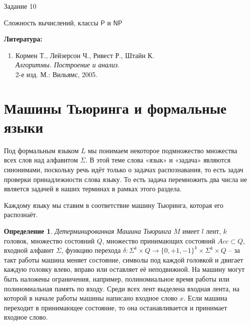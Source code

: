 \documentclass[12pt, leqno]{article}
\theoremstyle{definiton}
\theoremstyle{definition}
\newtheorem{Def}{Определение}
\theoremstyle{definition}
\def\PP{{\mathsf{P}}}
\def\NP{{\mathsf{NP}}}
\begin{document}
\centerline{\LARGE Задание 10}

\medskip

\begin{center}
	{\Large Сложность вычислений, классы $\PP$ и $\NP$ }
\end{center}

\bigskip

{\bf Литература: }
\begin{enumerate}

\item Кормен Т., Лейзерсон Ч., Ривест Р., Штайн К. \\ {\it Алгоритмы. Построение и анализ. }\\  2-е изд. М.: Вильямс, 2005.

\end{enumerate}

\section{Машины Тьюринга и формальные языки}

	Под формальным языком $L$ мы понимаем некоторое подмножество множества всех слов над алфавитом $\Sigma$. В этой теме слова «язык» и «задача» являются синонимами, поскольку речь идёт только о задачах распознавания, то есть задач проверки принадлежности слова языку. То есть задача перемножить два числа не является задачей в наших терминах в рамках этого раздела.
	
	Каждому языку мы ставим в соответствие машину Тьюринга, которая его распознаёт. 

\begin{Def} 

	\emph{Детерминированная Машина Тьюринга} $M$  имеет $l$ лент, $k$ головок, множество состояний $Q$, множество принимающих состояний $Acc \subset Q$,  входной алфавит $\Sigma$, функцию перехода $\delta : \Sigma^k\times Q \to \{0,+1,-1\}^k\times \Sigma^k\times Q  $ -- за такт работы машина меняет состояние, символы под каждой головкой и двигает каждую головку влево, вправо или оставляет её неподвижной. На машину могут быть наложены ограничения, например, полиномиальное время работы или полиномиальная память по входу. Среди всех лент выделена входная лента, на которой в начале работы машины написано входное слово $x$. Если машина переходит в принимающее состояние, то она останавливается и принимает входное слово. 
		
\end{Def}
\end{document}
